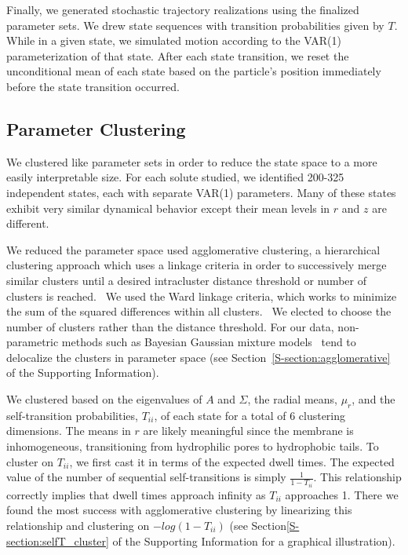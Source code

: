 \documentclass[journal=jpcbfk,manuscript=article]{achemso}
\begin{document}
  Finally, we generated stochastic trajectory realizations using the finalized
  parameter sets. We drew state sequences with transition probabilities given by
  $T$. While in a given state, we simulated motion according to the VAR(1)
  parameterization of that state. After each state transition, we reset the 
  unconditional mean of each state based on the particle's position immediately
  before the state transition occurred.
  
  \subsection{Parameter Clustering}\label{method:clustering}  
  
  We clustered like parameter sets in order to reduce the state space to
  a more easily interpretable size. For each solute studied, we identified 200-325
  independent states, each with separate VAR(1) parameters. Many of these states
  exhibit very similar dynamical behavior except their mean levels in $r$ and $z$
  are different.
  
  We reduced the parameter space used agglomerative clustering, a hierarchical
  clustering approach which uses a linkage criteria in order to successively merge
  similar clusters until a desired intracluster distance threshold or number of
  clusters is reached.~\cite{pedregosa_scikit-learn_2011} We used the Ward linkage 
  criteria, which works to minimize the sum of the squared differences within all
  clusters.~\cite{ward_hierarchical_1963} We elected to choose the number of clusters
  rather than the distance threshold. For our data, non-parametric methods such as 
  Bayesian Gaussian mixture models~\cite{pedregosa_scikit-learn_2011,gelman_bayesian_2013}
  tend to delocalize the clusters in parameter space (see Section~\ref{S-section:agglomerative}
  of the Supporting Information).
  
  We clustered based on the eigenvalues of $A$ and $\Sigma$, the radial means, $\mu_r$, 
  and the self-transition probabilities, $T_{ii}$, of each state for a total of 6 clustering
  dimensions. The means in $r$ are likely meaningful since the membrane is inhomogeneous, 
  transitioning from hydrophilic pores to hydrophobic tails. To cluster on $T_{ii}$, we first
  cast it in terms of the expected dwell times. The expected value of the number of sequential
  self-transitions is simply $\frac{1}{1 - T_{ii}}$. This relationship correctly implies that 
  dwell times approach infinity as $T_{ii}$ approaches 1. There we found the most success with
  agglomerative clustering by linearizing this relationship and clustering on $-log(1 - T_{ii})$
  (see Section\ref{S-section:selfT_cluster} of the Supporting Information for a graphical
  illustration).
  
\end{document}
